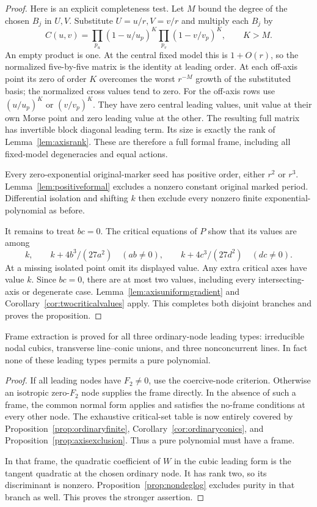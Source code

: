 \begin{proof}
Here is an explicit completeness test. Let $M$ bound the degree
of the chosen $B_j$ in $U,V$. Substitute $U=u/r,V=v/r$ and
multiply each $B_j$ by
\[
 C(u,v)=\prod_{p_u}(1-u/u_p)^K
                      \prod_{p_v}(1-v/v_p)^K,\qquad K>M.
\]
An empty product is one. At the central fixed model this is
$1+O(r)$, so the normalized five-by-five matrix is the identity
at leading order. At each off-axis point its zero of order $K$
overcomes the worst $r^{-M}$ growth of the substituted basis;
the normalized cross values tend to zero. For the off-axis rows
use $(u/u_p)^K$ or $(v/v_p)^K$. They have zero central leading
values, unit value at their own Morse point and zero leading
value at the other. The resulting full matrix has invertible
block diagonal leading term. Its size is exactly the rank of
Lemma~\ref{lem:axisrank}. These are therefore a full formal
frame, including all fixed-model degeneracies and equal actions.

Every zero-exponential original-marker seed has positive order,
either $r^2$ or $r^3$. Lemma~\ref{lem:positiveformal} excludes
a nonzero constant original marked period. Differential
isolation and shifting $k$ then exclude every nonzero finite
exponential-polynomial as before.

It remains to treat $bc=0$. The critical equations of $P$ show
that its values are among
\[
 k,\qquad k+4b^3/(27a^2)\quad(ab\ne0),\qquad
 k+4c^3/(27d^2)\quad(dc\ne0).
\]
At a missing isolated point omit its displayed value. Any extra
critical axes have value $k$. Since $bc=0$, there are at most
two values, including every intersecting-axis or degenerate
case. Lemma~\ref{lem:axisuniformgradient} and
Corollary~\ref{cor:twocriticalvalues} apply. This completes both
disjoint branches and proves the proposition.
\end{proof}

\begin{corollary}\label{cor:ordinarycomplete}
Frame extraction is proved for all three ordinary-node leading
types: irreducible nodal cubics, transverse line--conic unions,
and three nonconcurrent lines. In fact none of these leading
types permits a pure polynomial.
\end{corollary}
\begin{proof}
If all leading nodes have $F_2\ne0$, use the coercive-node
criterion. Otherwise an isotropic zero-$F_2$ node supplies the
frame directly. In the absence of such a frame, the common
normal form applies and satisfies the no-frame conditions at
every other node. The exhaustive critical-set table is now
entirely covered by Proposition~\ref{prop:ordinaryfinite},
Corollary~\ref{cor:ordinaryconics}, and
Proposition~\ref{prop:axisexclusion}. Thus a pure polynomial
must have a frame.

In that frame, the quadratic coefficient of $W$ in the cubic
leading form is the tangent quadratic at the chosen ordinary
node. It has rank two, so its discriminant is nonzero.
Proposition~\ref{prop:nondeglog} excludes purity in that branch
as well. This proves the stronger assertion.
\end{proof}
